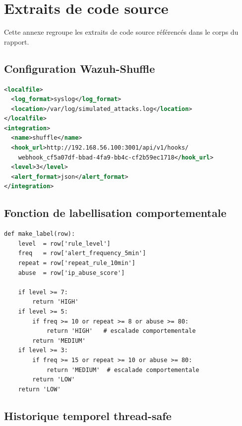 \documentclass[12pt,a4paper]{report}
\begin{document}
\appendix

\chapter{Extraits de code source}
\label{annexe:code}

Cette annexe regroupe les extraits de code source référencés
dans le corps du rapport.

\section{Configuration Wazuh-Shuffle}

\begin{lstlisting}[style=mycode, language=XML,
  caption={Configuration intégration Wazuh-Shuffle (wazuh\_manager.conf)}]
<localfile>
  <log_format>syslog</log_format>
  <location>/var/log/simulated_attacks.log</location>
</localfile>
<integration>
  <name>shuffle</name>
  <hook_url>http://192.168.56.100:3001/api/v1/hooks/
    webhook_cf5a07df-bbad-4fa9-bb4c-cf2b59ec1718</hook_url>
  <level>3</level>
  <alert_format>json</alert_format>
</integration>
\end{lstlisting}

\section{Fonction de labellisation comportementale}

\begin{lstlisting}[style=mycode,
  caption={Fonction make\_label — labellisation comportementale (train.py)}]
def make_label(row):
    level  = row['rule_level']
    freq   = row['alert_frequency_5min']
    repeat = row['repeat_rule_10min']
    abuse  = row['ip_abuse_score']

    if level >= 7:
        return 'HIGH'
    if level >= 5:
        if freq >= 10 or repeat >= 8 or abuse >= 80:
            return 'HIGH'   # escalade comportementale
        return 'MEDIUM'
    if level >= 3:
        if freq >= 15 or repeat >= 10 or abuse >= 80:
            return 'MEDIUM'  # escalade comportementale
        return 'LOW'
    return 'LOW'
\end{lstlisting}

\section{Historique temporel thread-safe}
\end{document}
